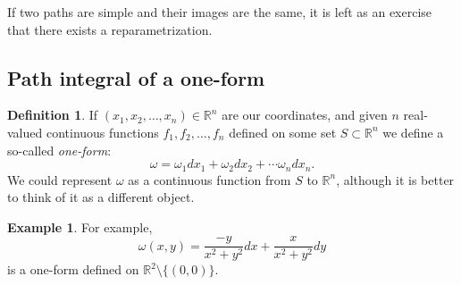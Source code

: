 \documentclass[12pt]{book}
\newcommand{\R}{{\mathbb{R}}}
\newcommand{\myindex}[1]{#1\index{#1}}
\theoremstyle{plain}
\theoremstyle{remark}
\theoremstyle{definition}
\newtheorem{defn}[thm]{Definition}
\theoremstyle{exercise}
\theoremstyle{example}
\newtheorem{example}[thm]{Example}
\begin{document}

If two paths are simple and their images are the same, it is
left as an exercise that there exists a reparametrization.

\subsection{Path integral of a one-form}

\begin{defn}
If $(x_1,x_2,\ldots,x_n) \in \R^n$ are our coordinates, and
given $n$ real-valued continuous functions $f_1,f_2,\ldots,f_n$ defined on some set $S \subset \R^n$ we
define a so-called \emph{\myindex{one-form}}:
\begin{equation*}
\omega = \omega_1 dx_1 + \omega_2 dx_2 + \cdots \omega_n dx_n .
\end{equation*}
We could represent $\omega$ as a continuous function from $S$ to $\R^n$, although it is
better to think of it as a different object.
\end{defn}

\begin{example}
For example,
\begin{equation*}
\omega(x,y) = \frac{-y}{x^2+y^2} dx + \frac{x}{x^2+y^2} dy
\end{equation*}
is a one-form defined on $\R^2 \setminus \{ (0,0) \}$.
\end{example}
\end{document}
